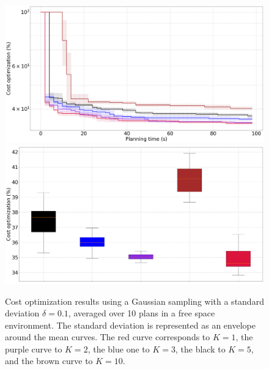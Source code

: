 \begin{figure} [htp]
    \centering
    \includegraphics[width=0.9\linewidth]{figures/appendix/gaussian_radius_0_1.png} \\
    \includegraphics[width=0.9\linewidth]{figures/appendix/bplot_gaussian_radius_0_1.png}
    \caption{Cost optimization results using a Gaussian sampling with a standard deviation $\delta = 0.1$, averaged over 10 plans in a free space environment. 
    The standard deviation is represented as an envelope around the mean curves.
    The red curve corresponds to $K = 1$, the purple curve to $K = 2$, the blue one to $K = 3$, the black to $K = 5$, and the brown curve to $K = 10$.}%
    \label{fig:gaussian_radius_0_1}%
\end{figure}

